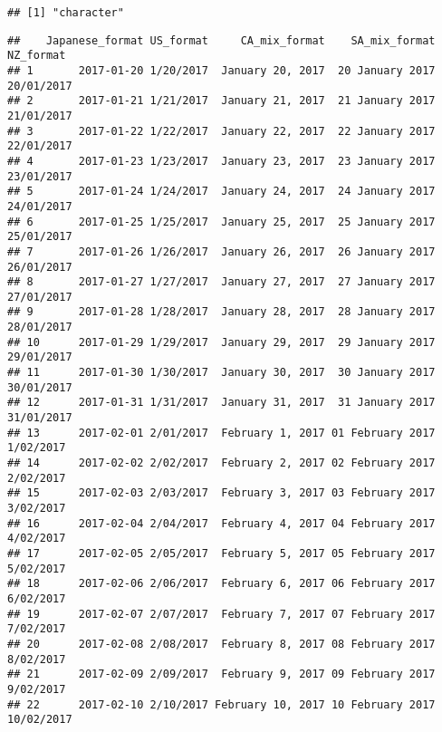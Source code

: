 \documentclass[
]{article}
\newenvironment{Shaded}{\begin{snugshade}}{\end{snugshade}}
\newcommand{\AttributeTok}[1]{\textcolor[rgb]{0.13,0.29,0.53}{#1}}
\newcommand{\FunctionTok}[1]{\textcolor[rgb]{0.13,0.29,0.53}{\textbf{#1}}}
\newcommand{\NormalTok}[1]{#1}
\newcommand{\OtherTok}[1]{\textcolor[rgb]{0.56,0.35,0.01}{#1}}
\newcommand{\SpecialCharTok}[1]{\textcolor[rgb]{0.81,0.36,0.00}{\textbf{#1}}}
\newcommand{\StringTok}[1]{\textcolor[rgb]{0.31,0.60,0.02}{#1}}
\begin{document}
\begin{verbatim}
## [1] "character"
\end{verbatim}

\begin{Shaded}
\end{Shaded}

\begin{verbatim}
##    Japanese_format US_format     CA_mix_format    SA_mix_format  NZ_format
## 1       2017-01-20 1/20/2017  January 20, 2017  20 January 2017 20/01/2017
## 2       2017-01-21 1/21/2017  January 21, 2017  21 January 2017 21/01/2017
## 3       2017-01-22 1/22/2017  January 22, 2017  22 January 2017 22/01/2017
## 4       2017-01-23 1/23/2017  January 23, 2017  23 January 2017 23/01/2017
## 5       2017-01-24 1/24/2017  January 24, 2017  24 January 2017 24/01/2017
## 6       2017-01-25 1/25/2017  January 25, 2017  25 January 2017 25/01/2017
## 7       2017-01-26 1/26/2017  January 26, 2017  26 January 2017 26/01/2017
## 8       2017-01-27 1/27/2017  January 27, 2017  27 January 2017 27/01/2017
## 9       2017-01-28 1/28/2017  January 28, 2017  28 January 2017 28/01/2017
## 10      2017-01-29 1/29/2017  January 29, 2017  29 January 2017 29/01/2017
## 11      2017-01-30 1/30/2017  January 30, 2017  30 January 2017 30/01/2017
## 12      2017-01-31 1/31/2017  January 31, 2017  31 January 2017 31/01/2017
## 13      2017-02-01 2/01/2017  February 1, 2017 01 February 2017  1/02/2017
## 14      2017-02-02 2/02/2017  February 2, 2017 02 February 2017  2/02/2017
## 15      2017-02-03 2/03/2017  February 3, 2017 03 February 2017  3/02/2017
## 16      2017-02-04 2/04/2017  February 4, 2017 04 February 2017  4/02/2017
## 17      2017-02-05 2/05/2017  February 5, 2017 05 February 2017  5/02/2017
## 18      2017-02-06 2/06/2017  February 6, 2017 06 February 2017  6/02/2017
## 19      2017-02-07 2/07/2017  February 7, 2017 07 February 2017  7/02/2017
## 20      2017-02-08 2/08/2017  February 8, 2017 08 February 2017  8/02/2017
## 21      2017-02-09 2/09/2017  February 9, 2017 09 February 2017  9/02/2017
## 22      2017-02-10 2/10/2017 February 10, 2017 10 February 2017 10/02/2017
\end{verbatim}
\end{document}
